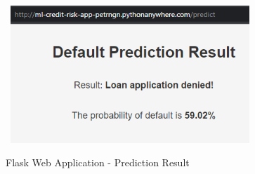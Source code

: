 \begin{figure}[H]
    \centering
    \caption{Flask Web Application - Prediction Result}\vspace{0.5em}
    \label{fig:flaskres}\
    \includegraphics[width=90mm]{Figures/flask_app_result.jpg}

    \vspace{-1em}
\end{figure}